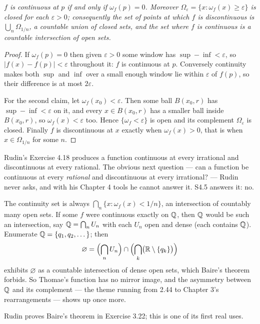 \emph{$f$ is continuous at $p$ if and only if $\omega_f(p) = 0$. Moreover
$\Omega_\varepsilon = \{x : \omega_f(x) \ge \varepsilon\}$ is closed for each
$\varepsilon > 0$; consequently the set of points at which $f$ is
\emph{discontinuous} is $\bigcup_n \Omega_{1/n}$, a countable union of closed
sets, and the set where $f$ is continuous is a countable intersection of
open sets.}
\begin{proof}
If $\omega_f(p)=0$ then given $\varepsilon>0$ some window has
$\sup - \inf < \varepsilon$, so $|f(x)-f(p)| < \varepsilon$ throughout it:
$f$ is continuous at $p$. Conversely continuity makes both $\sup$ and $\inf$
over a small enough window lie within $\varepsilon$ of $f(p)$, so their
difference is at most $2\varepsilon$.

For the second claim, let $\omega_f(x_0) < \varepsilon$. Then some ball
$B(x_0,r)$ has $\sup-\inf < \varepsilon$ on it, and every $x \in B(x_0,r)$
has a smaller ball inside $B(x_0,r)$, so $\omega_f(x) < \varepsilon$ too.
Hence $\{\omega_f < \varepsilon\}$ is open and its complement
$\Omega_\varepsilon$ is closed. Finally $f$ is discontinuous at $x$ exactly
when $\omega_f(x)>0$, that is when $x \in \Omega_{1/n}$ for some $n$.
\end{proof}

\begin{deeper}
Rudin's Exercise 4.18 produces a function continuous at every irrational and
discontinuous at every rational. The obvious next question --- can a function
be continuous at every \emph{rational} and discontinuous at every irrational?
--- Rudin never asks, and with his Chapter 4 tools he cannot answer it. S4.5
answers it: no.

The continuity set is always $\bigcap_n \{x : \omega_f(x) < 1/n\}$, an
intersection of countably many open sets. If some $f$ were continuous exactly
on $\mathbb{Q}$, then $\mathbb{Q}$ would be such an intersection, say $\mathbb{Q} = \bigcap_n U_n$
with each $U_n$ open and dense (each contains $\mathbb{Q}$). Enumerate
$\mathbb{Q} = \{q_1,q_2,\dots\}$; then
\[ \varnothing = \Bigl(\bigcap_n U_n\Bigr) \cap
   \Bigl(\bigcap_k \bigl(\mathbb{R}\setminus\{q_k\}\bigr)\Bigr) \]
exhibits $\varnothing$ as a countable intersection of dense open sets, which
Baire's theorem forbids. So Thomae's function has no mirror image, and the
asymmetry between $\mathbb{Q}$ and its complement --- the theme running from 2.44 to
Chapter 3's rearrangements --- shows up once more.

Rudin proves Baire's theorem in Exercise 3.22; this is one of its first real
uses.
\end{deeper}

